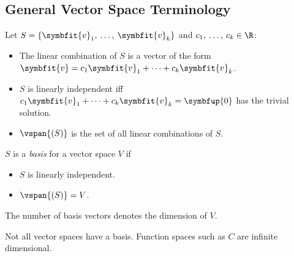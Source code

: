 \documentclass{article}
\begin{document}
\begin{multicols*}{3}
    \subsection{General Vector Space Terminology}
    Let \(S = \left\{ \symbfit{v}_1,\: \dots,\: \symbfit{v}_k \right\}\) and \(c_1,\: \dots,\: c_k \in \R\):
    \begin{itemize}[leftmargin=*,itemsep=-1ex,partopsep=1ex,parsep=1ex]
        \item The linear combination of \(S\)
              is a vector of the form \(\symbfit{v} = c_1 \symbfit{v}_1 + \cdots + c_k \symbfit{v}_k\).
        \item \(S\) is linearly independent iff
              \(c_1 \symbfit{v}_1 + \cdots + c_k \symbfit{v}_k = \symbfup{0}\) has the trivial solution.
        \item \(\vspan{\left( S \right)}\) is the set of all linear combinations of \(S\).
    \end{itemize}
    \(S\) is a \textit{basis} for a vector space \(V\) if
    \begin{itemize}[leftmargin=*,itemsep=-1ex,partopsep=1ex,parsep=1ex]
        \item \(S\) is linearly independent.
        \item \(\vspan{\left( S \right)} = V\).
    \end{itemize}
    The number of basis vectors denotes the dimension of \(V\).

    Not all vector spaces have a basis. Function spaces such as \(C\)
    are infinite dimensional.

\end{multicols*}
\end{document}
